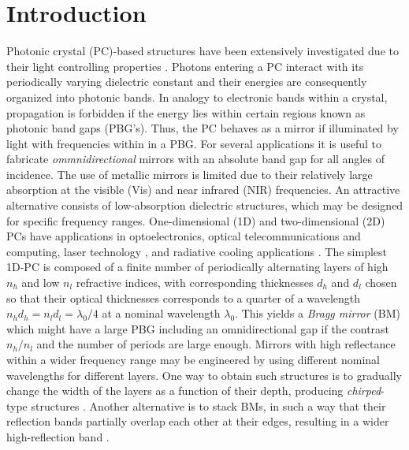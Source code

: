 \documentclass[a4paper,fleqn]{cas-sc}
\begin{document}
\maketitle

\section{Introduction}

Photonic crystal (PC)-based structures have been extensively investigated due
to their light controlling properties \cite{Joannopoulos2008,Goyal2018}.
Photons entering a PC interact with its periodically varying dielectric constant and
their energies are consequently organized into photonic bands. In
analogy to electronic bands within a
crystal, propagation is forbidden if the energy lies
within certain regions known as photonic band gaps (PBG's). Thus, the
PC behaves as a mirror if illuminated by light with frequencies
within in a PBG. For several applications it is useful to fabricate
{\em ommnidirectional} mirrors with an absolute band gap for all angles of incidence.
The use of metallic
mirrors is limited due to their relatively large absorption at the
visible (Vis) and near infrared (NIR) frequencies.  An attractive alternative
consists of low-absorption dielectric
structures,  which may be designed for specific frequency
ranges. One-dimensional (1D) and two-dimensional (2D) PCs have
applications in optoelectronics, optical telecommunications and computing,
laser technology \cite{Lopez2003,Masaya2010}, and radiative cooling applications
\cite{Kumar2020}. The simplest 1D-PC is composed of a finite number
of periodically alternating
layers of high $n_h$ and low $n_l$ refractive indices, with
corresponding thicknesses $d_h$ and $d_l$ chosen so that their optical
thicknesses corresponds to a quarter of a wavelength
$n_hd_h=n_ld_l=\lambda_{0}/4$ at a nominal
wavelength $\lambda_{0}$. This yields a {\em Bragg mirror} (BM)
which might have a large PBG including an omnidirectional gap if the contrast $n_h/n_l$
and the number of periods are large enough. Mirrors with high
reflectance within a wider frequency range may be engineered by
using different nominal wavelengths for different layers.
One way to obtain such structures is to gradually change the width of
the layers as a function of their depth, producing
\textit{chirped}-type structures \cite{Zipock1997}.
Another alternative is to stack BMs, in such a way that their reflection bands partially
overlap each other at their edges, resulting in a wider high-reflection band \cite{Xifre2009}.
\end{document}
